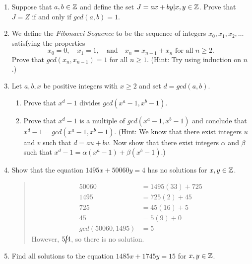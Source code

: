 \documentclass{hw}
\begin{document}

\begin{enumerate}
\item Suppose that $a,b\in\mathbb{Z}$ and define the set $J={ax+by|x,y\in\mathbb{Z}}$. Prove that $J=Z$ if and only if
$gcd(a, b) = 1$.


\item We define the \textit{Fibonacci Sequence} to be the sequence of integers ${x_{0}, x_{1}, x_{2},\dots}$
satisfying the properties
\[
x_{0} = 0,\quad x_{1} = 1,\quad\text{and}\quad x_{n} = x_{n-1}+x_{n}\text{ for all } n\geq2.
\]
Prove that $gcd(x_{n},x_{n-1}) = 1$ for all $n \geq 1$. (Hint: Try using induction on $n$.)


\item Let $a, b, x$ be positive integers with $x \geq 2$ and set $d = gcd(a, b)$.
\begin{enumerate}
\item Prove that $x^{d} - 1$ divides $gcd(x^{a} - 1, x^{b} - 1)$.

\item Prove that $x^{d}-1$ is a multiple of $gcd(x^{a}-1,x^{b}-1)$ and conclude that
$x^{d}-1 = gcd(x^{a}-1,x^{b}-1)$. (Hint: We know that there exist integers $u$ and $v$ such that
$d = au + bv$. Now show that there exist integers $\alpha$ and $\beta$ such that
$x^{d}-1 = \alpha(x^{a}-1) + \beta(x^{b}-1)$.)

\end{enumerate}


\item Show that the equation $1495x + 50060y = 4$ has no solutions for $x,y\in\mathbb{Z}$.
\begin{quote}
\begin{align*}
50060 &= 1495(33) + 725\\
1495 &= 725(2) + 45\\
725 &= 45(16) + 5\\
45 &= 5(9) + 0\\
gcd(50060,1495) &= 5
\end{align*}
However, $5\cancel{|}4$, so there is no solution.
\end{quote}

\item Find all solutions to the equation $1485x + 1745y = 15$ for $x,y\in\mathbb{Z}$.


\end{enumerate}
\end{document}
